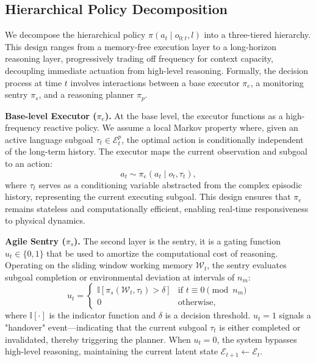 \subsection{Hierarchical Policy Decomposition}
We decompose the hierarchical policy $\pi(a_t \mid o_{0:t}, l)$ into a three-tiered hierarchy. 
This design ranges from a memory-free execution layer to a long-horizon reasoning layer, progressively trading off frequency for context capacity, decoupling immediate actuation from high-level reasoning. Formally, the decision process at time $t$ involves interactions between a base executor $\pi_e$, a monitoring sentry $\pi_s$, and a reasoning planner $\pi_p$.


\textbf{Base-level Executor ($\pi_e$).}
At the base level, the executor functions as a high-frequency reactive policy. We assume a local Markov property where, given an active language subgoal $\tau_t \in \mathcal{E}_t^p$, the optimal action is conditionally independent of the long-term history. The executor maps the current observation and subgoal to an action:
\begin{equation}
    a_t \sim \pi_e(a_t \mid o_t, \tau_t),
\end{equation}
where $\tau_t$ serves as a conditioning variable abstracted from the complex episodic history, representing the current executing subgoal. This design ensures that $\pi_e$ remains stateless and computationally efficient, enabling real-time responsiveness to physical dynamics.


\textbf{Agile Sentry ($\pi_s$).}
The second layer is the sentry, it is a gating function $u_t \in \{0, 1\}$ that be used to amortize the computational cost of reasoning. Operating on the sliding window working memory $\mathcal{W}_t$, the sentry evaluates subgoal completion or environmental deviation at intervals of $n_m$:
\begin{equation}
    u_t = 
    \begin{cases} 
    \mathbb{I}[\pi_s(\mathcal{W}_t, \tau_t) > \delta] & \text{if } t \equiv 0 \pmod{n_m} \\
    0 & \text{otherwise,}
    \end{cases}
\end{equation}
where $\mathbb{I}[\cdot]$ is the indicator function and $\delta$ is a decision threshold. $u_t=1$ signals a "handover" event—indicating that the current subgoal $\tau_t$ is either completed or invalidated, thereby triggering the planner. When $u_t=0$, the system bypasses high-level reasoning, maintaining the current latent state $\mathcal{E}_{t+1} \leftarrow \mathcal{E}_t$.


